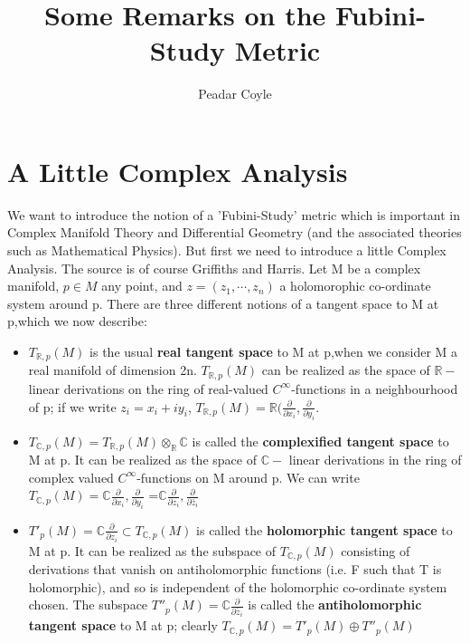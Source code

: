 \documentclass[12pt, oneside, a4paper]{article}
\title{\bf Some Remarks on the Fubini-Study Metric}
\author{Peadar Coyle}
\theoremstyle{definition}
\def\Cbb{\ensuremath{\mathbb{C}}}
\def\Rbb{\ensuremath{\mathbb{R}}}
\newcommand{\tensor}{\otimes}
\begin{document}
\maketitle

\newpage

\tableofcontents

\section{A Little Complex Analysis}
We want to introduce the notion of a 'Fubini-Study' metric which is important in Complex Manifold Theory and Differential Geometry
(and the associated theories such as Mathematical Physics).
  But first we need to introduce a little Complex Analysis. The source is of course Griffiths and Harris.
Let M be a complex manifold, $p \in M$ any point, and $z=(z_{1},\cdots,z_{n})$ a holomorophic co-ordinate system around p. 
There are three different notions of a tangent space to M at p,which we now describe:
\begin{itemize}
 \item $T_{\Rbb,p}(M)$ is the usual \textbf{real tangent space} to M at p,when we consider M a real manifold of dimension
2n. $T_{\Rbb,p}(M)$ can be realized as the space of $\Rbb-$linear derivations on the ring of real-valued $C^{\infty}$-functions
in a neighbourhood of p; if we write $z_i = x_i + iy_i$,
$T_{\Rbb,p}(M) = \Rbb(\frac{\partial}{\partial x_{i}}, \frac{\partial}{\partial y_i}$.
\item $T_{\Cbb,p}(M) = T_{\Rbb,p}(M)\tensor_{\Rbb} \Cbb$ is called the \textbf{complexified tangent space} to M at p.
It can be realized as the space of $\Cbb -$ linear derivations in the ring of complex valued $C^{\infty}$-functions on M around p.
We can write 
$T_{\Cbb,p}(M) = \Cbb{\frac{\partial}{\partial x_{i}},\frac{\partial}{\partial y_i}}$
\newline =$\Cbb{\frac{\partial}{\partial z_{i}},\frac{\partial}{\partial \bar{z}_i}}$
\item $T'_p(M)= \Cbb{\frac{\partial}{\partial z_{i}}}\subset T_{\Cbb, p}(M)$ is called the \textbf{holomorphic tangent space}
to M at p. It can be realized as the subspace of $T_{\Cbb,p}(M)$ consisting of derivations that vanish on antiholomorphic functions
(i.e. F such that T is holomorphic), and so is independent of the holomorphic co-ordinate system chosen. 
The subspace $T''_p(M)= \Cbb{\frac{\partial}{\partial \bar{z}_{i}}}$ is called the 
\textbf{antiholomorphic tangent space} to M at p;
clearly 
$T_{\Cbb,p}(M) = T'_p(M) \oplus T''_p(M)$
\end{itemize}
\end{document}

